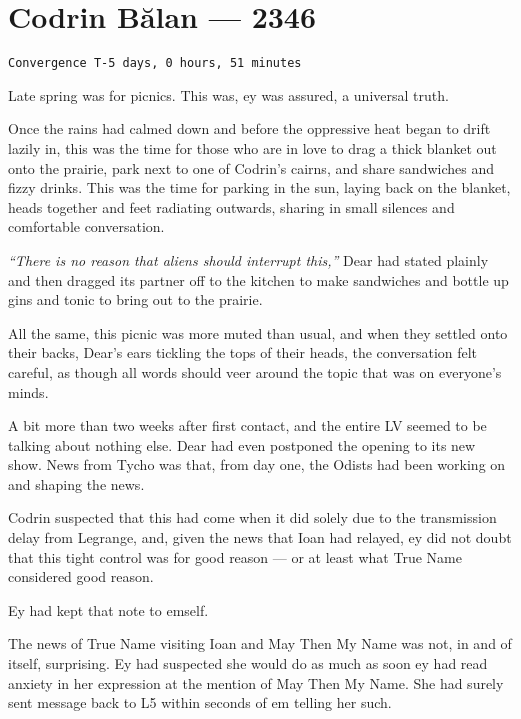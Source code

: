 \hypertarget{codrin-bux103lan-2346}{%
\chapter{Codrin Bălan — 2346}\label{codrin-bux103lan-2346}}

\begin{verbatim}
Convergence T-5 days, 0 hours, 51 minutes
\end{verbatim}

Late spring was for picnics. This was, ey was assured, a universal truth.

Once the rains had calmed down and before the oppressive heat began to drift lazily in, this was the time for those who are in love to drag a thick blanket out onto the prairie, park next to one of Codrin's cairns, and share sandwiches and fizzy drinks. This was the time for parking in the sun, laying back on the blanket, heads together and feet radiating outwards, sharing in small silences and comfortable conversation.

\emph{``There is no reason that aliens should interrupt this,''} Dear had stated plainly and then dragged its partner off to the kitchen to make sandwiches and bottle up gins and tonic to bring out to the prairie.

All the same, this picnic was more muted than usual, and when they settled onto their backs, Dear's ears tickling the tops of their heads, the conversation felt careful, as though all words should veer around the topic that was on everyone's minds.

A bit more than two weeks after first contact, and the entire LV seemed to be talking about nothing else. Dear had even postponed the opening to its new show. News from Tycho was that, from day one, the Odists had been working on and shaping the news.

Codrin suspected that this had come when it did solely due to the transmission delay from Legrange, and, given the news that Ioan had relayed, ey did not doubt that this tight control was for good reason — or at least what True Name considered good reason.

Ey had kept that note to emself.

The news of True Name visiting Ioan and May Then My Name was not, in and of itself, surprising. Ey had suspected she would do as much as soon ey had read anxiety in her expression at the mention of May Then My Name. She had surely sent message back to L5 within seconds of em telling her such.

